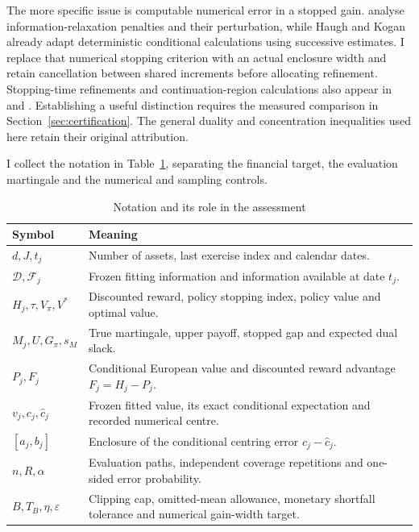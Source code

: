 \documentclass[11pt]{article}
\newcommand{\F}{\mathcal F}
\begin{document}
The more specific issue is computable numerical error in a stopped gain. \citet{brown2010} analyse information-relaxation penalties and their perturbation, while Haugh and Kogan already adapt deterministic conditional calculations using successive estimates. I replace that numerical stopping criterion with an actual enclosure width and retain cancellation between shared increments before allocating refinement. Stopping-time refinements and continuation-region calculations also appear in \citet{joshi2014} and \citet{ibanez2020}. Establishing a useful distinction requires the measured comparison in Section~\ref{sec:certification}. The general duality and concentration inequalities used here retain their original attribution.

I collect the notation in Table~\ref{tab:notation}, separating the financial target, the evaluation martingale and the numerical and sampling controls.

\begin{table}[!htbp]
\centering\small
\caption{Notation and its role in the assessment}\label{tab:notation}
\begin{tabularx}{\textwidth}{@{}lX@{}}
\toprule
Symbol & Meaning \\
\midrule
$d,J,t_j$ & Number of assets, last exercise index and calendar dates. \\
$\mathcal D,\F_j$ & Frozen fitting information and information available at date $t_j$. \\
$H_j,\tau,V_\pi,V^*$ & Discounted reward, policy stopping index, policy value and optimal value. \\
$M_j,U,G_\pi,s_M$ & True martingale, upper payoff, stopped gap and expected dual slack. \\
$P_j,F_j$ & Conditional European value and discounted reward advantage $F_j=H_j-P_j$. \\
$v_j,c_j,\widehat c_j$ & Frozen fitted value, its exact conditional expectation and recorded numerical centre. \\
$[a_j,b_j]$ & Enclosure of the conditional centring error $c_j-\widehat c_j$. \\
$n,R,\alpha$ & Evaluation paths, independent coverage repetitions and one-sided error probability. \\
$B,T_B,\eta,\varepsilon$ & Clipping cap, omitted-mean allowance, monetary shortfall tolerance and numerical gain-width target. \\
\bottomrule
\end{tabularx}
\end{table}
\end{document}

